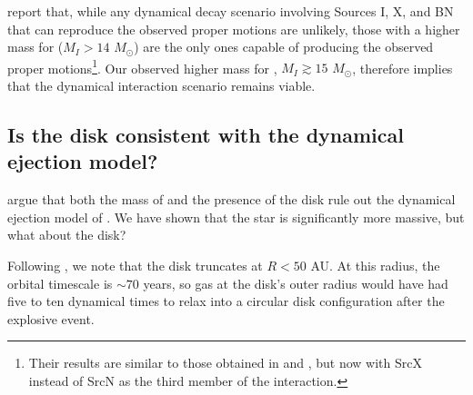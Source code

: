 \documentclass[twocolumn]{aastex61}
\newcommand{\msun}{\ensuremath{M_{\odot}}\xspace}			%
\newcommand{\sourcen}{SrcN\xspace}
\newcommand{\sourcex}{SrcX\xspace}
\begin{document}
\citet{Farias2017b} report that, while any dynamical decay scenario involving
Sources I, X, and BN that can reproduce the observed proper motions are
unlikely, those with a higher mass for \sourcei ($M_I>14$ \msun) are the only
ones capable of producing the observed proper motions\footnote{Their results
are similar to those obtained in \citet{Goddi2011b} and \citet{Moeckel2012b},
but now with \sourcex instead of \sourcen as the third member of the
interaction.}.  Our observed higher mass for \sourcei, $M_I\gtrsim15$ \msun,
therefore implies that the
dynamical interaction scenario remains viable.



\subsection{Is the disk consistent with the dynamical ejection model?}
\citet{Plambeck2016a} argue that both the mass of \sourcei and the presence of
the disk rule out the dynamical ejection model of \citet{Bally2011a}.  We have
shown that the star is significantly more massive, but what about the disk?

Following \citet{Bally2011a}, we note that the disk truncates at $R<50$
AU.  At this radius, the orbital timescale is $\sim70$ years, so gas at the
disk's outer radius would have had five to ten dynamical times to relax into a
circular disk configuration after the explosive event.
\end{document}
